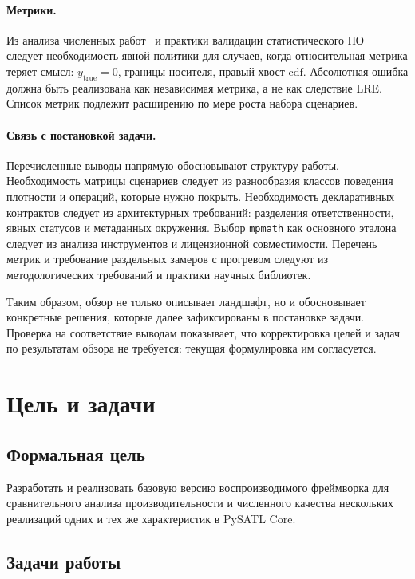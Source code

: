 \documentclass[12pt,a4paper]{article}
\begin{document}
\paragraph{Метрики.}
Из анализа численных работ~\cite{goldberg1991,higham2002,ieee754}
и практики валидации статистического ПО~\cite{mccullough1999}
следует необходимость явной политики для случаев, когда
относительная метрика теряет смысл: \(y_{\text{true}} = 0\),
границы носителя, правый хвост \(\mathrm{cdf}\). Абсолютная
ошибка должна быть реализована как независимая метрика,
а не как следствие LRE. Список метрик подлежит расширению
по мере роста набора сценариев.

\paragraph{Связь с постановкой задачи.}
Перечисленные выводы напрямую обосновывают структуру работы.
Необходимость матрицы сценариев следует из разнообразия классов
поведения плотности и операций, которые нужно покрыть.
Необходимость декларативных контрактов следует из архитектурных
требований: разделения ответственности, явных статусов
и метаданных окружения. Выбор \texttt{mpmath} как основного
эталона следует из анализа инструментов и лицензионной
совместимости. Перечень метрик и требование раздельных замеров
с прогревом следуют из методологических требований и практики
научных библиотек.

Таким образом, обзор не только описывает ландшафт, но и
обосновывает конкретные решения, которые далее зафиксированы
в постановке задачи. Проверка на соответствие выводам показывает,
что корректировка целей и задач по результатам обзора
не требуется: текущая формулировка им согласуется.
\newpage

\section{Цель и задачи}
\label{sec:goals}

\subsection*{Формальная цель}

Разработать и реализовать базовую версию воспроизводимого фреймворка
для сравнительного анализа производительности и численного качества
нескольких реализаций одних и тех же характеристик в PySATL Core.

\subsection*{Задачи работы}
\end{document}
